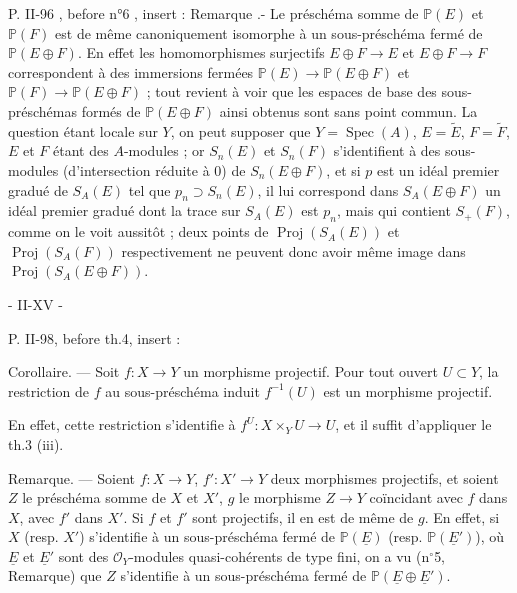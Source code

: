 P. II-96 , before n°6 , insert :
Remarque .- Le préschéma somme de $\mathbb{P}(E)$ et $\mathbb{P}(F)$ est de même canoniquement isomorphe à un sous-préschéma fermé de $\mathbb{P}(E \oplus F)$. En effet les homomorphismes surjectifs $E \oplus F \to E$ et $E \oplus F \to F$ correspondent à des immersions fermées $\mathbb{P}(E) \to \mathbb{P}(E \oplus F)$ et $\mathbb{P}(F) \to \mathbb{P}(E \oplus F)$ ; tout revient à voir que les espaces de base des sous-préschémas formés de $\mathbb{P}(E \oplus F)$ ainsi obtenus sont sans point commun. La question étant locale sur $Y$, on peut supposer que $Y=\operatorname{Spec}(A)$, $E=\tilde{E}$, $F=\tilde{F}$, $E$ et $F$ étant des $A$-modules ; or $S_n(E)$ et $S_n(F)$ s'identifient à des sous-modules (d'intersection réduite à $0$) de $S_n(E \oplus F)$, et si $p$ est un idéal premier gradué de $S_A(E)$ tel que $p_n \supset S_n(E)$, il lui correspond dans $S_A(E \oplus F)$ un idéal premier gradué dont la trace sur $S_A(E)$ est $p_n$, mais qui contient $S_+(F)$, comme on le voit aussitôt ; deux points de $\operatorname{Proj}(S_A(E))$ et $\operatorname{Proj}(S_A(F))$ respectivement ne peuvent donc avoir même image dans $\operatorname{Proj}(S_A(E \oplus F))$.

\newpage


\noindent - II-XV -

\vspace{1em}

\noindent P. II-98, before th.4, insert :

\noindent Corollaire. — Soit $f : X \to Y$ un morphisme projectif. Pour tout ouvert $U \subset Y$, la restriction de $f$ au sous-préschéma induit $f^{-1}(U)$ est un morphisme projectif.

\noindent En effet, cette restriction s'identifie à $f^U : X \times_Y U \to U$, et il suffit d'appliquer le th.3 (iii).

\noindent Remarque. — Soient $f : X \to Y$, $f' : X' \to Y$ deux morphismes projectifs, et soient $Z$ le préschéma somme de $X$ et $X'$, $g$ le morphisme $Z \to Y$ coïncidant avec $f$ dans $X$, avec $f'$ dans $X'$. Si $f$ et $f'$ sont projectifs, il en est de même de $g$. En effet, si $X$ (resp. $X'$) s'identifie à un sous-préschéma fermé de $\mathbb{P}(\underline{E})$ (resp. $\mathbb{P}(\underline{E}')$), où $\underline{E}$ et $\underline{E}'$ sont des $\mathcal{O}_Y$-modules quasi-cohérents de type fini, on a vu (n$^\circ$5, Remarque) que $Z$ s'identifie à un sous-préschéma fermé de $\mathbb{P}(\underline{E} \oplus \underline{E}')$.

